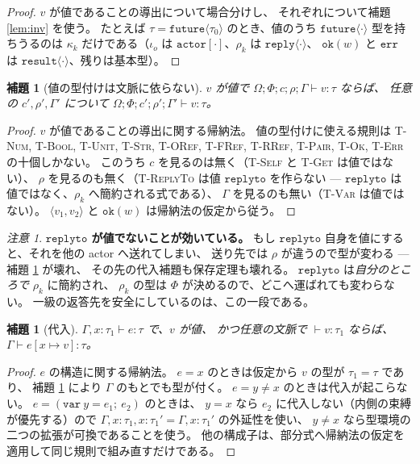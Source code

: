 \documentclass[11pt,a4paper]{ltjsarticle}
\newtheorem{lemma}[theorem]{補題}
\theoremstyle{definition}
\theoremstyle{remark}
\newtheorem{remark}[theorem]{注意}
\newcommand{\tact}[1]{\ensuremath{\mathtt{actor}[#1]}}
\newcommand{\tfut}[1]{\ensuremath{\mathtt{future}\langle #1 \rangle}}
\newcommand{\trep}[1]{\ensuremath{\mathtt{reply}\langle #1 \rangle}}
\newcommand{\tres}[1]{\ensuremath{\mathtt{result}\langle #1 \rangle}}
\newcommand{\Om}{\Omega}
\newcommand{\Ph}{\Phi}
\newcommand{\subs}[2]{[#1 \mapsto #2]}
\begin{document}
\begin{proof}
$v$ が値であることの導出について場合分けし、
それぞれについて補題 \ref{lem:inv} を使う。
たとえば $\tau = \tfut{\tau_0}$ のとき、値のうち \tfut{\cdot} 型を持ちうるのは
$\kappa_k$ だけである（$\iota_o$ は \tact{\cdot}、$\rho_k$ は \trep{\cdot}、
$\mathtt{ok}(w)$ と $\mathtt{err}$ は \tres{\cdot}、残りは基本型）。
\end{proof}

\begin{lemma}[値の型付けは文脈に依らない]\label{lem:vindep}
$v$ が値で $\Om;\Ph;c;\rho;\Gamma \vdash v : \tau$ ならば、
任意の $c',\rho',\Gamma'$ について $\Om;\Ph;c';\rho';\Gamma' \vdash v : \tau$。
\end{lemma}

\begin{proof}
$v$ が値であることの導出に関する帰納法。
値の型付けに使える規則は \textsc{T-Num}, \textsc{T-Bool}, \textsc{T-Unit},
\textsc{T-Str}, \textsc{T-ORef}, \textsc{T-FRef}, \textsc{T-RRef},
\textsc{T-Pair}, \textsc{T-Ok}, \textsc{T-Err} の十個しかない。
このうち $c$ を見るのは無く（\textsc{T-Self} と \textsc{T-Get} は値ではない）、
$\rho$ を見るのも無く（\textsc{T-ReplyTo} は値 $\mathtt{replyto}$ を作らない ---
$\mathtt{replyto}$ は値ではなく、$\rho_k$ へ簡約される式である）、
$\Gamma$ を見るのも無い（\textsc{T-Var} は値ではない）。
$\langle v_1,v_2\rangle$ と $\mathtt{ok}(w)$ は帰納法の仮定から従う。
\end{proof}

\begin{remark}
\textbf{$\mathtt{replyto}$ が値でないことが効いている。}
もし $\mathtt{replyto}$ 自身を値にすると、それを他の actor へ送れてしまい、
送り先では $\rho$ が違うので型が変わる --- 補題 \ref{lem:vindep} が壊れ、
その先の代入補題も保存定理も壊れる。
$\mathtt{replyto}$ は\emph{自分のところで} $\rho_k$ に簡約され、
$\rho_k$ の型は $\Ph$ が決めるので、どこへ運ばれても変わらない。
一級の返答先を安全にしているのは、この一段である。
\end{remark}

\begin{lemma}[代入]\label{lem:subst}
$\Gamma, x{:}\tau_1 \vdash e : \tau$ で、$v$ が値、
かつ任意の文脈で $\vdash v : \tau_1$ ならば、$\Gamma \vdash e\subs{x}{v} : \tau$。
\end{lemma}

\begin{proof}
$e$ の構造に関する帰納法。
$e = x$ のときは仮定から $v$ の型が $\tau_1 = \tau$ であり、
補題 \ref{lem:vindep} により $\Gamma$ のもとでも型が付く。
$e = y \neq x$ のときは代入が起こらない。
$e = (\mathtt{var}\ y = e_1;\ e_2)$ のときは、
$y = x$ なら $e_2$ に代入しない（内側の束縛が優先する）ので
$\Gamma, x{:}\tau_1, x{:}\tau_1' = \Gamma, x{:}\tau_1'$ の外延性を使い、
$y \neq x$ なら型環境の二つの拡張が可換であることを使う。
他の構成子は、部分式へ帰納法の仮定を適用して同じ規則で組み直すだけである。
\end{proof}
\end{document}
